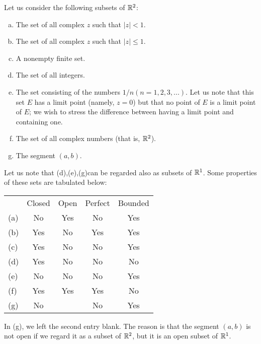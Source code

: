 \begin{newexample}
    \label{newexample:2.21}
    Let us consider the following subsets of ${\protect\mathbb R}^{2}$:
    \begin{enumerate}[(a)]
        \item The set of all complex $z$ such that $|z| < 1$.
        \item The set of all complex $z$ such that $|z| \leq 1$.
        \item A nonempty finite set.
        \item The set of all integers.
        \item The set consisting of the numbers $1/n(n=1,2,3,...)$. Let us note that this set $E$ has a limit point (namely, $z =0$) but that no point of $E$ is a limit point of $E$; we wish to stress the difference between having a limit point and containing one.
        \item The set of all complex numbers (that is, ${\protect\mathbb R}^{2}$).
        \item The segment $(a,b)$.
    \end{enumerate}
\end{newexample}

Let us note that (d),(e),(g)can be regarded also as subsets of ${\protect\mathbb R}^{1}$.
Some properties of these sets are tabulated below:

\begin{center}
    \begin{tabular}{lcccc}
        & Closed & Open & Perfect & Bounded \\
    (a) & No     & Yes  & No      & Yes     \\
    (b) & Yes    & No   & Yes     & Yes     \\
    (c) & Yes    & No   & No      & Yes     \\
    (d) & Yes    & No   & No      & No      \\
    (e) & No     & No   & No      & Yes     \\
    (f) & Yes    & Yes  & Yes     & No      \\
    (g) & No     &      & No      & Yes    
    \end{tabular}
\end{center}

In (g), we left the second entry blank. 
The reason is that the segment $(a,b)$ is not open 
if we regard it as a subset of ${\protect\mathbb R}^2$, 
but it is an open subset of ${\protect\mathbb R}^1$.


